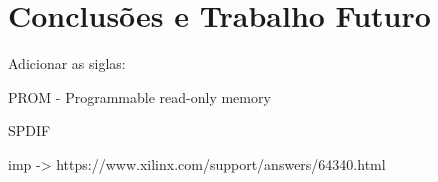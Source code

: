 \chapter{Conclusões e Trabalho Futuro} \label{chap:concl}

Adicionar as siglas:

PROM - Programmable read-only memory


SPDIF

imp -> https://www.xilinx.com/support/answers/64340.html